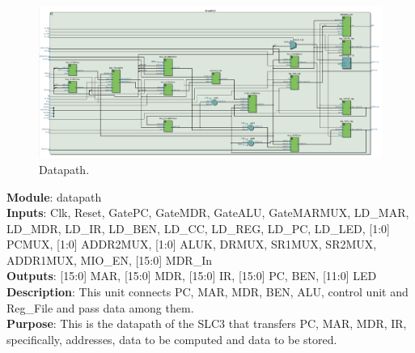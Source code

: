 \documentclass[12pt]{article}
\begin{document}
\begin{figure}[H]
    \centering
    \includegraphics[width=15cm]{datapath.png}
    \caption{Datapath.}
\end{figure}
\textbf{Module}: datapath \\ 
\textbf{Inputs}: Clk, Reset, GatePC, GateMDR, GateALU, GateMARMUX, LD\_MAR, LD\_MDR, LD\_IR, LD\_BEN, LD\_CC, LD\_REG, LD\_PC, LD\_LED, [1:0] PCMUX, [1:0] ADDR2MUX, [1:0] ALUK, DRMUX, SR1MUX, SR2MUX, ADDR1MUX, MIO\_EN, [15:0] MDR\_In\\ 
\textbf{Outputs}: [15:0] MAR, [15:0] MDR, [15:0] IR, [15:0] PC, BEN, [11:0] LED \\ 
\textbf{Description}: This unit connects PC, MAR, MDR, BEN, ALU, control unit and Reg\_File and pass data among them. \\
\textbf{Purpose}: This is the datapath of the SLC3 that transfers PC, MAR, MDR, IR, specifically, addresses, data to be computed and data to be stored. \\
\end{document}
